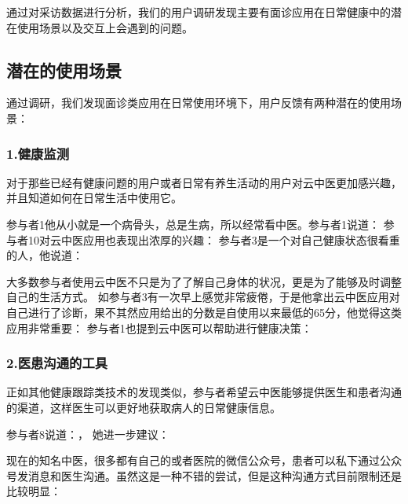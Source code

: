 通过对采访数据进行分析，我们的用户调研发现主要有面诊应用在日常健康中的潜在使用场景以及交互上会遇到的问题。
% 
\subsection{潜在的使用场景}
通过调研，我们发现面诊类应用在日常使用环境下，用户反馈有两种潜在的使用场景：

\subsubsection{1.健康监测}

对于那些已经有健康问题的用户或者日常有养生活动的用户对云中医更加感兴趣，并且知道如何在日常生活中使用它。

参与者1他从小就是一个病骨头，总是生病，所以经常看中医。参与者1说道：
参与者10对云中医应用也表现出浓厚的兴趣：
参与者3是一个对自己健康状态很看重的人，他说道：

大多数参与者使用云中医不只是为了了解自己身体的状况，更是为了能够及时调整自己的生活方式。
如参与者3有一次早上感觉非常疲倦，于是他拿出云中医应用对自己进行了诊断，果不其然应用给出的分数是自使用以来最低的65分，他觉得这类应用非常重要：
参与者1也提到云中医可以帮助进行健康决策：


\subsubsection{2.医患沟通的工具}

正如其他健康跟踪类技术的发现类似，参与者希望云中医能够提供医生和患者沟通的渠道，这样医生可以更好地获取病人的日常健康信息。

参与者8说道：， 她进一步建议：

现在的知名中医，很多都有自己的或者医院的微信公众号，患者可以私下通过公众号发消息和医生沟通。虽然这是一种不错的尝试，但是这种沟通方式目前限制还是比较明显：

